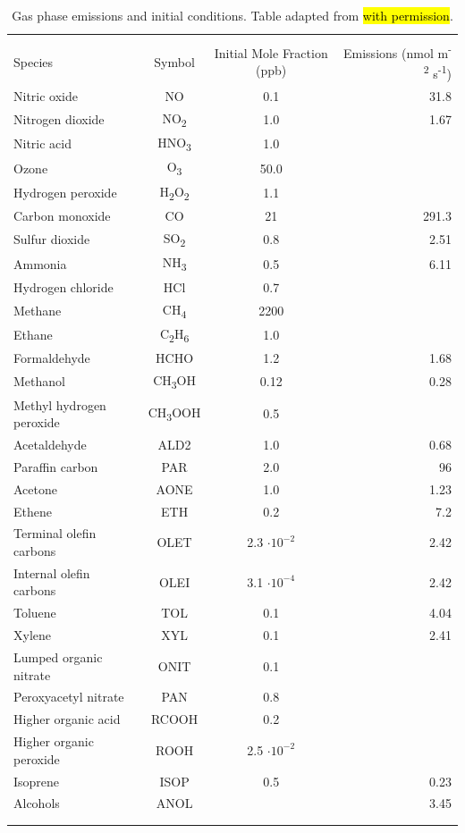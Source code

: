 \begin{table}[h]
\centering
\caption{Gas phase emissions and initial conditions. Table adapted from \cite{riemer_simulating_2009} \hl{with permission}.}
\begin{tabular*}{\linewidth}{@{\extracolsep{\fill}} lccr}
\\[-2ex]\hline 
     \hline \\[-2ex] Species & Symbol & Initial Mole Fraction (ppb) & Emissions (nmol m\textsuperscript{-2} s\textsuperscript{-1}) \\
\midrule
Nitric oxide & NO & 0.1 & 31.8 \\
Nitrogen dioxide & NO\textsubscript{2} & 1.0 & 1.67 \\
Nitric acid & HNO\textsubscript{3} & 1.0 & \\
Ozone & O\textsubscript{3} & 50.0 & \\
Hydrogen peroxide & H\textsubscript{2}O\textsubscript{2} & 1.1 & \\
Carbon monoxide & CO & 21 & 291.3 \\
Sulfur dioxide & SO\textsubscript{2} & 0.8 & 2.51 \\
Ammonia & NH\textsubscript{3} & 0.5 & 6.11 \\
Hydrogen chloride & HCl & 0.7 & \\
Methane & CH\textsubscript{4} & 2200 & \\
Ethane & C\textsubscript{2}H\textsubscript{6} & 1.0 & \\
Formaldehyde & HCHO & 1.2 & 1.68 \\
Methanol & CH\textsubscript{3}OH & 0.12 & 0.28 \\
Methyl hydrogen peroxide & CH\textsubscript{3}OOH & 0.5 & \\
Acetaldehyde & ALD2 & 1.0 & 0.68 \\
Paraffin carbon & PAR & 2.0 & 96 \\
Acetone & AONE & 1.0 & 1.23 \\
Ethene & ETH & 0.2 & 7.2 \\
Terminal olefin carbons & OLET & 2.3 \(\cdot 10^{-2}\) & 2.42 \\
Internal olefin carbons & OLEI & 3.1 \(\cdot 10^{-4}\) & 2.42 \\
Toluene & TOL & 0.1 & 4.04 \\
Xylene & XYL & 0.1 & 2.41 \\
Lumped organic nitrate & ONIT & 0.1 & \\
Peroxyacetyl nitrate & PAN & 0.8 & \\
Higher organic acid & RCOOH & 0.2 & \\
Higher organic peroxide & ROOH & 2.5 \(\cdot 10^{-2}\) & \\
Isoprene & ISOP & 0.5 & 0.23 \\
Alcohols & ANOL & & 3.45 \\
\\[-2ex]\hline 
     \hline \\[-2ex]
\end{tabular*}
\label{table:gas_emiss_ics}
\end{table}


